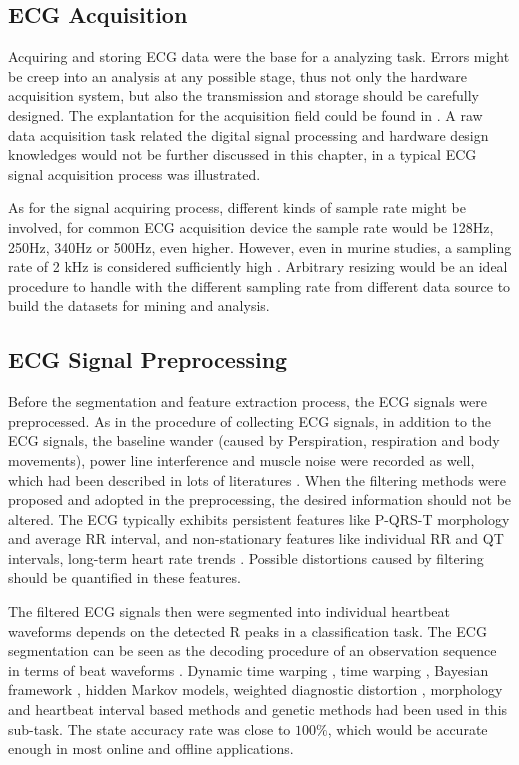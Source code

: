 \documentclass{bmcart}
\begin{document}

\subsection*{ECG Acquisition}
Acquiring and storing ECG data were the base for a analyzing task. Errors might be creep into an analysis at any possible stage, thus not only the hardware acquisition system, but also the transmission and storage should be carefully designed. The explantation for the acquisition field could be found in \cite{clifford2006web}. A raw data acquisition task related the digital signal processing and hardware design knowledges would not be further discussed in this chapter, in \cite{silva2011dsp} a typical ECG signal acquisition process was illustrated. 

As for the signal acquiring process, different kinds of sample rate might be involved, for common ECG acquisition device the sample rate would be 128Hz, 250Hz, 340Hz or 500Hz, even higher. However, even in murine studies, a sampling rate of 2 kHz is considered sufficiently high \cite{ai1996studies}. Arbitrary resizing would be an ideal procedure to handle with the different sampling rate from different data source to build the datasets for mining and analysis.

\subsection*{ECG Signal Preprocessing}
Before the segmentation and feature extraction process, the ECG signals were preprocessed. As in the procedure of collecting ECG signals,  in addition to the ECG signals, the baseline wander (caused by Perspiration, respiration and body movements), power line interference and muscle noise were recorded as well, which had been described in lots of literatures \cite{blanco2008ecg}.
When the filtering methods were proposed and adopted in the preprocessing, the desired information should not be altered. The ECG typically exhibits persistent features like P-QRS-T morphology and average RR interval,  and non-stationary features like individual RR and QT intervals, long-term heart rate trends \cite{clifford2006advanced}. Possible distortions caused by filtering should be quantified in these features.

The filtered ECG signals then were segmented into individual heartbeat waveforms depends on the detected R peaks in a classification task.  The ECG segmentation can be seen as the decoding procedure of an observation sequence in terms of beat waveforms \cite{andreao2006ecg}. Dynamic time warping \cite{vullings1998automated}, time warping \cite{vullings1997ecg}, Bayesian framework \cite{sayadi2009model}, hidden Markov models\cite{andreao2006ecg}, weighted diagnostic distortion \cite{zigel2000weighted}, morphology and heartbeat interval based methods \cite{de2004automatic} and genetic methods \cite{gacek2003genetic} had been used in this sub-task. The state accuracy rate was close to $100\%$, which would be accurate enough in most online and offline applications. 
\end{document}

